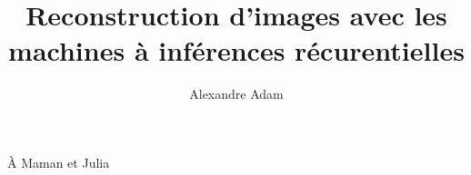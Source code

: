 \documentclass[
  normalmargins,
  11pt,
  openany,
  onehalfspacing,
]{ut-thesis}
\author{Alexandre Adam}
\title{Reconstruction d'images avec les machines à inférences récurentielles}
\begin{document}
  \frontmatter
    \maketitle

    \begin{resume}
    \end{resume}
    \begin{abstract}
    \end{abstract}

    \tableofcontents
    \listoftables
    \listoffigures
    \printglossaries

        \clearpage
    \begin{dedication}
      À Maman et Julia
    \end{dedication}
    \begin{acknowledgements}
            

           


    \end{acknowledgements}
  \mainmatter
        \glsaddall
    

%

{\scriptsize
  
}

  \appendix
  
  
  

\end{document}

